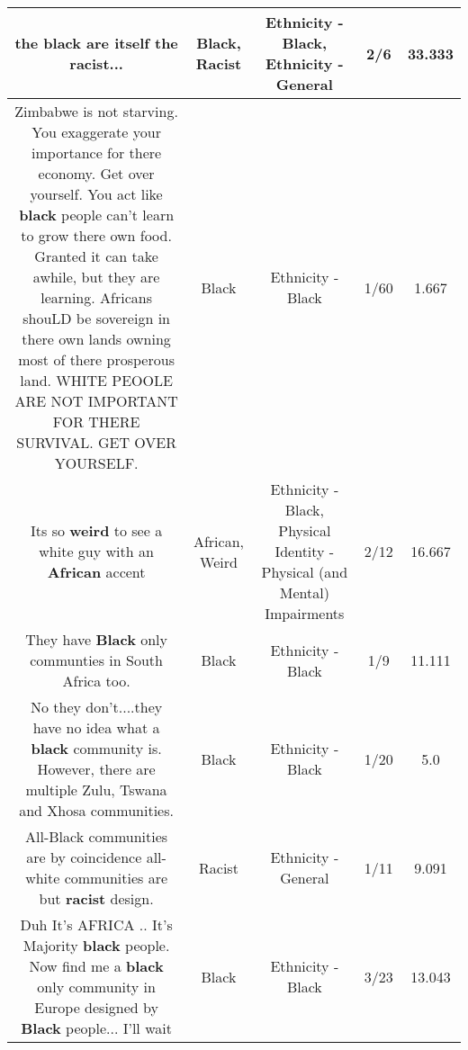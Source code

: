 \documentclass[11pt]{article}
\newlength\mylength
\begin{document}
\begin{center}
\begin{longtable}{|C{.65\mylength}|C{.30\mylength}|C{.12\mylength}|C{.12\mylength}|C{.12\mylength}|}
  \small the \textbf{black} are itself the \textbf{racist}...\normalsize   & Black, Racist & Ethnicity - Black, Ethnicity - General & 2/6 & 33.333 \\  \hline
  \small Zimbabwe is not starving. You exaggerate your importance for there economy. Get over yourself. You act like \textbf{black} people can't learn to grow there own food. Granted it can take awhile, but they are learning. Africans shouLD be sovereign in there own lands owning most of there prosperous land. WHITE PEOOLE ARE NOT IMPORTANT FOR THERE SURVIVAL. GET OVER YOURSELF.\normalsize   & Black & Ethnicity - Black & 1/60 & 1.667 \\  \hline
  \small Its so \textbf{weird} to see a white guy with an \textbf{African} accent\normalsize   & African, Weird & Ethnicity - Black, Physical Identity - Physical (and Mental) Impairments & 2/12 & 16.667 \\  \hline
  \small They have \textbf{Black} only communties in South Africa too.\normalsize   & Black & Ethnicity - Black & 1/9 & 11.111 \\  \hline
  \small No they don't....they have no idea what a \textbf{black} community is. However, there are multiple Zulu, Tswana and Xhosa communities.\normalsize   & Black & Ethnicity - Black & 1/20 & 5.0 \\  \hline
  \small All-Black communities are by coincidence all-white communities are but \textbf{racist} design.\normalsize   & Racist & Ethnicity - General & 1/11 & 9.091 \\  \hline
  \small Duh It's AFRICA .. It's Majority \textbf{black} people. Now find me a \textbf{black} only community in Europe designed by \textbf{Black} people... I'll wait\normalsize   & Black & Ethnicity - Black & 3/23 & 13.043 \\  \hline

\end{longtable}
\end{center}
\end{document}
